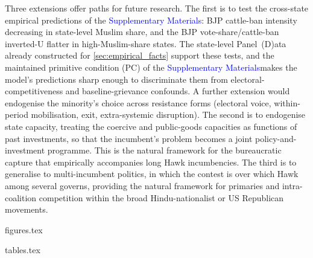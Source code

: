 \documentclass[11pt,twoside]{extarticle}
\newcommand{\suppmat}{\textcolor{blue}{Supplementary Materials}}
\begin{document}
Three extensions offer paths for future research. The first is to test the cross-state empirical predictions of the \suppmat: BJP cattle-ban intensity decreasing in state-level Muslim share, and the BJP vote-share/cattle-ban inverted-U flatter in high-Muslim-share states. The state-level Panel~(D)ata already constructed for \autoref{sec:empirical_facts} support these tests, and the maintained primitive condition (PC) of the \suppmat makes the model's predictions sharp enough to discriminate them from electoral-competitiveness and baseline-grievance confounds. A further extension would endogenise the minority's choice across resistance forms (electoral voice, within-period mobilisation, exit, extra-systemic disruption). The second is to endogenise state capacity, treating the coercive and public-goods capacities as functions of past investments, so that the incumbent's problem becomes a joint policy-and-investment programme. This is the natural framework for the bureaucratic capture that empirically accompanies long Hawk incumbencies. The third is to generalise to multi-incumbent politics, in which the contest is over which Hawk among several governs, providing the natural framework for primaries and intra-coalition competition within the broad Hindu-nationalist or US Republican movements.


\clearpage
\newpage
\singlespacing
\footnotesize


\begingroup

\endgroup

\normalsize
\clearpage
{figures.tex}

\clearpage
{tables.tex}

\end{document}

